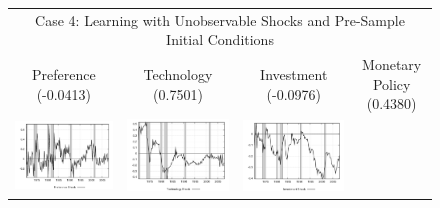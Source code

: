 \begin{figure}
\begin{tabular}{cccc}
\multicolumn{4}{c}{Case 4: Learning with Unobservable Shocks and Pre-Sample Initial Conditions} \\ 
Preference (-0.0413) & Technology (0.7501) & Investment (-0.0976) & Monetary Policy (0.4380) \\
\includegraphics[scale=0.22]{results_wlsinit/prefshock.png} & 
\includegraphics[scale=0.22]{results_wlsinit/techshock.png} & 
\includegraphics[scale=0.22]{results_wlsinit/invshock.png} & 

\end{tabular}
\end{figure}
